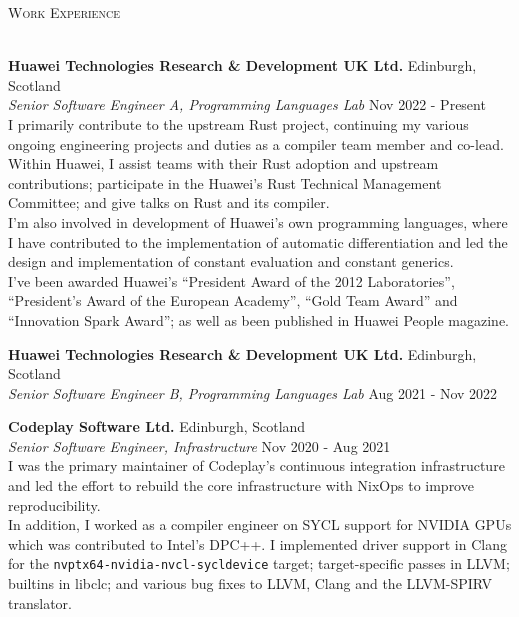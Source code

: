 \documentclass[a4paper]{article}
\newcommand{\lineunder} {
  \vspace*{-8pt} \\
  \hspace*{-18pt} \hrulefill \\
}
\newcommand{\header} [1] {
  {\hspace*{-18pt}\vspace*{6pt} \textsc{#1}}
  \vspace*{-6pt} \lineunder
}
\begin{document}
\header{Work Experience}
\vspace{1mm}

\textbf{Huawei Technologies Research \& Development UK Ltd.} \hfill {\color{gray} Edinburgh, Scotland} \\
\textit{Senior Software Engineer A, Programming Languages Lab} \hfill {\color{gray} Nov 2022 - Present} \\
\vspace{2mm}
I primarily contribute to the upstream Rust project, continuing my various ongoing engineering
projects and duties as a compiler team member and co-lead. Within Huawei, I assist teams with their
Rust adoption and upstream contributions; participate in the Huawei's Rust Technical Management
Committee; and give talks on Rust and its compiler. \\
\vspace{2mm}
I'm also involved in development of Huawei's own programming languages, where I have contributed
to the implementation of automatic differentiation and led the design and implementation of constant
evaluation and constant generics. \\
\vspace{2mm}
I've been awarded Huawei's ``President Award of the 2012 Laboratories'', ``President's Award of the
European Academy'', ``Gold Team Award'' and ``Innovation Spark Award''; as well as been published
in Huawei People magazine.
\vspace{2mm}

\textbf{Huawei Technologies Research \& Development UK Ltd.} \hfill {\color{gray} Edinburgh, Scotland} \\
\textit{Senior Software Engineer B, Programming Languages Lab} \hfill {\color{gray} Aug 2021 - Nov 2022} \\
\vspace{2mm}

\textbf{Codeplay Software Ltd.} \hfill {\color{gray} Edinburgh, Scotland} \\
\textit{Senior Software Engineer, Infrastructure} \hfill {\color{gray} Nov 2020 - Aug 2021} \\
\vspace{2mm}
I was the primary maintainer of Codeplay's continuous integration infrastructure and led the effort
to rebuild the core infrastructure with NixOps to improve reproducibility. \\
\vspace{2mm}
In addition, I worked as a compiler engineer on SYCL support for NVIDIA GPUs which was contributed
to Intel's DPC++. I implemented driver support in Clang for the
\verb|nvptx64-nvidia-nvcl-sycldevice| target; target-specific passes in LLVM; builtins in libclc;
and various bug fixes to LLVM, Clang and the LLVM-SPIRV translator.
\vspace{2mm}
\end{document}
